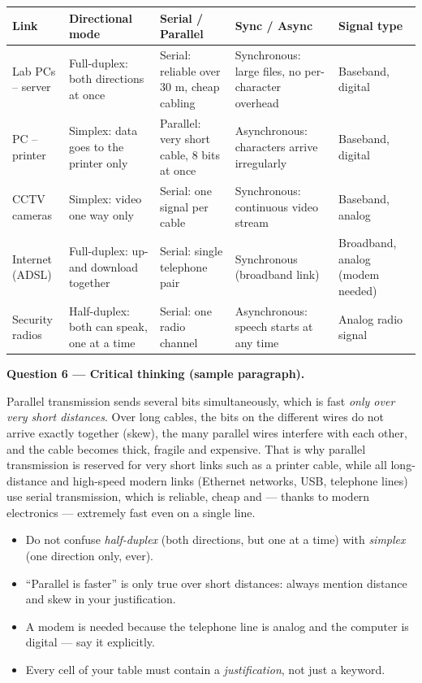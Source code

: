 \documentclass[11pt]{article}
\begin{document}
\begin{center}
\begin{tabularx}{\linewidth}{|l|X|X|X|X|}
\hline
\rowcolor{popblueL} \textbf{Link} & \textbf{Directional mode} & \textbf{Serial / Parallel} & \textbf{Sync / Async} & \textbf{Signal type} \\
\hline
Lab PCs -- server & Full-duplex: both directions at once & Serial: reliable over 30 m, cheap cabling & Synchronous: large files, no per-character overhead & Baseband, digital \\
\hline
PC -- printer & Simplex: data goes to the printer only & Parallel: very short cable, 8 bits at once & Asynchronous: characters arrive irregularly & Baseband, digital \\
\hline
CCTV cameras & Simplex: video one way only & Serial: one signal per cable & Synchronous: continuous video stream & Baseband, analog \\
\hline
Internet (ADSL) & Full-duplex: up- and download together & Serial: single telephone pair & Synchronous (broadband link) & Broadband, analog (modem needed) \\
\hline
Security radios & Half-duplex: both can speak, one at a time & Serial: one radio channel & Asynchronous: speech starts at any time & Analog radio signal \\
\hline
\end{tabularx}
\end{center}

\textbf{Question 6 — Critical thinking (sample paragraph).}

Parallel transmission sends several bits simultaneously, which is fast \emph{only over very short distances}. Over long cables, the bits on the different wires do not arrive exactly together (skew), the many parallel wires interfere with each other, and the cable becomes thick, fragile and expensive. That is why parallel transmission is reserved for very short links such as a printer cable, while all long-distance and high-speed modern links (Ethernet networks, USB, telephone lines) use serial transmission, which is reliable, cheap and — thanks to modern electronics — extremely fast even on a single line.

\begin{attention}
\begin{itemize}
\item Do not confuse \emph{half-duplex} (both directions, but one at a time) with \emph{simplex} (one direction only, ever).
\item ``Parallel is faster'' is only true over short distances: always mention distance and skew in your justification.
\item A modem is needed because the telephone line is analog and the computer is digital — say it explicitly.
\item Every cell of your table must contain a \emph{justification}, not just a keyword.
\end{itemize}
\end{attention}
\end{document}

